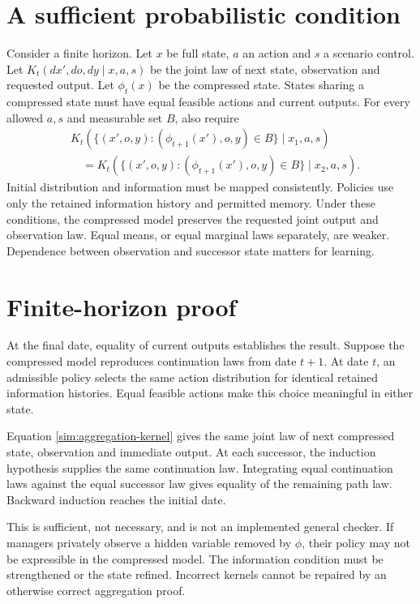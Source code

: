 \section{A sufficient probabilistic condition}
Consider a finite horizon. Let $x$ be full state, $a$ an action and $s$ a scenario control. Let $K_t(dx',do,dy\mid x,a,s)$ be the joint law of next state, observation and requested output. Let $\phi_t(x)$ be the compressed state. States sharing a compressed state must have equal feasible actions and current outputs. For every allowed $a,s$ and measurable set $B$, also require
\begin{align}
 &K_t(\{(x',o,y):(\phi_{t+1}(x'),o,y)\in B\}\mid x_1,a,s)\nonumber\\
 &\quad=K_t(\{(x',o,y):(\phi_{t+1}(x'),o,y)\in B\}\mid x_2,a,s).
 \label{sim:aggregation-kernel}
\end{align}
Initial distribution and information must be mapped consistently. Policies use only the retained information history and permitted memory. Under these conditions, the compressed model preserves the requested joint output and observation law. Equal means, or equal marginal laws separately, are weaker. Dependence between observation and successor state matters for learning.

\section{Finite-horizon proof}
At the final date, equality of current outputs establishes the result. Suppose the compressed model reproduces continuation laws from date $t+1$. At date $t$, an admissible policy selects the same action distribution for identical retained information histories. Equal feasible actions make this choice meaningful in either state.

Equation \eqref{sim:aggregation-kernel} gives the same joint law of next compressed state, observation and immediate output. At each successor, the induction hypothesis supplies the same continuation law. Integrating equal continuation laws against the equal successor law gives equality of the remaining path law. Backward induction reaches the initial date.

This is sufficient, not necessary, and is not an implemented general checker. If managers privately observe a hidden variable removed by $\phi$, their policy may not be expressible in the compressed model. The information condition must be strengthened or the state refined. Incorrect kernels cannot be repaired by an otherwise correct aggregation proof.

